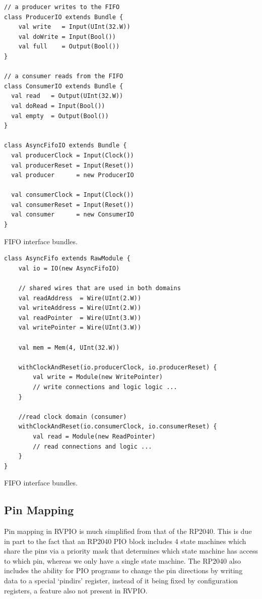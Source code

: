 \begin{listing}[h!]
    \vspace{0.5cm}
    \begin{verbatim}
// a producer writes to the FIFO
class ProducerIO extends Bundle {
    val write   = Input(UInt(32.W))
    val doWrite = Input(Bool())
    val full    = Output(Bool())
}

// a consumer reads from the FIFO
class ConsumerIO extends Bundle {
  val read   = Output(UInt(32.W))
  val doRead = Input(Bool())
  val empty  = Output(Bool())
}

class AsyncFifoIO extends Bundle {
  val producerClock = Input(Clock())
  val producerReset = Input(Reset())
  val producer      = new ProducerIO

  val consumerClock = Input(Clock())
  val consumerReset = Input(Reset())
  val consumer      = new ConsumerIO
}
    \end{verbatim}
    \caption{FIFO interface bundles.}
    \label{lst:fifobundles}
\end{listing}


\begin{listing}[h!]
    \vspace{0.5cm}
    \begin{verbatim}
class AsyncFifo extends RawModule {
    val io = IO(new AsyncFifoIO)
    
    // shared wires that are used in both domains
    val readAddress  = Wire(UInt(2.W))
    val writeAddress = Wire(UInt(2.W))
    val readPointer  = Wire(UInt(3.W))
    val writePointer = Wire(UInt(3.W))
    
    val mem = Mem(4, UInt(32.W))
    
    withClockAndReset(io.producerClock, io.producerReset) {
        val write = Module(new WritePointer)
        // write connections and logic logic ...
    }
    
    //read clock domain (consumer)
    withClockAndReset(io.consumerClock, io.consumerReset) {
        val read = Module(new ReadPointer)
        // read connections and logic ...
    }
}
    \end{verbatim}
    \caption{FIFO interface bundles.}
    \label{lst:fifo}
\end{listing}

\subsection{Pin Mapping}

Pin mapping in RVPIO is much simplified from that of the RP2040. This is due in part to the fact that an RP2040 PIO block includes 4 state machines which share the pins via a priority mask that determines which state machine has access to which pin, whereas we only have a single state machine. The RP2040 also includes the ability for PIO programs to change the pin directions by writing data to a special `pindirs' register, instead of it being fixed by configuration registers, a feature also not present in RVPIO.

